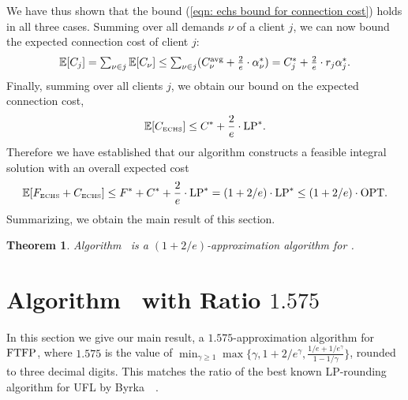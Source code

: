 \documentclass[oneside,final]{ucr}
\newtheorem{theorem}{Theorem}
\begin{document}
We have thus shown that the bound (\ref{eqn: echs bound for connection cost})
holds in all three cases.
Summing over all demands $\nu$ of a client $j$, we can now bound
the expected connection cost of client $j$:
%
\begin{equation*}
  \mathbb{E}[C_j] = \textstyle\sum_{\nu\in j} \mathbb{E}[C_\nu] 
\leq {\textstyle\sum_{\nu\in j} (C^{{\mbox{\scriptsize\rm avg}}}_{\nu} + \frac{2}{e}\cdot\alpha_{\nu}^\ast) }
  = { C_j^\ast + \frac{2}{e}\cdot r_j\alpha_j^\ast}.
\end{equation*}
%
Finally, summing over all clients $j$, we obtain our bound on
the expected connection cost,
%
\begin{equation*}
 \mathbb{E}[ C_{\mbox{\tiny\rm ECHS}}] \le C^\ast + \frac{2}{e}\cdot\mbox{\rm LP}^\ast.
\end{equation*}
% 
Therefore we have established that
our algorithm constructs a feasible integral solution with
an overall expected cost 
%
\begin{equation*}
  \label{eq:chudakall}
	 \mathbb{E}[ F_{\mbox{\tiny\rm ECHS}} + C_{\mbox{\tiny\rm ECHS}}]
	\le
  	F^\ast + C^\ast + \frac{2}{e}\cdot \mbox{\rm LP}^\ast = (1+2/e)\cdot \mbox{\rm LP}^\ast
  \leq (1+2/e)\cdot \mbox{\rm OPT}.
\end{equation*}
%
Summarizing, we obtain the main result of this section.

\begin{theorem}\label{thm:1736}
  Algorithm~{\ECHS} is a $(1+2/e)$-approximation algorithm for \FTFP.
\end{theorem}

\section{Algorithm~{\EBGS} with Ratio $1.575$}
\label{sec: 1.575-approximation}

In this section we give our main result, a $1.575$-approximation
algorithm for $\mbox{\rm FTFP}$, where $1.575$ is the value of $\min_{\gamma\geq
  1}\max\{\gamma, 1+2/e^\gamma, \frac{1/e+1/e^\gamma}{1-1/\gamma}\}$,
rounded to three decimal digits. This matches the ratio of the best
known LP-rounding algorithm for UFL by
Byrka~{\etal}~\cite{ByrkaGS10}. 
\end{document}

